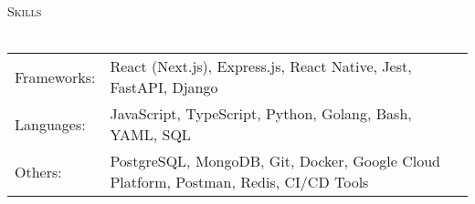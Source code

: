 \documentclass[a4paper]{article}
\newcommand{\lineunder} {
    \vspace*{-8pt} \\
    \hspace*{-12pt} \hrulefill \\
}
\newcommand{\header} [1] {
    {\hspace*{-12pt}\vspace*{6pt} \large\textsc{#1}}
    \vspace*{-6pt} \lineunder
}
\begin{document}
\header{Skills}
\vspace{1mm}
\begin{tabular}{ l l }
	Frameworks: & React (Next.js), Express.js, React Native, Jest, FastAPI, Django              \\
	Languages:  & JavaScript, TypeScript, Python, Golang, Bash, YAML, SQL                                \\
	Others:     & PostgreSQL, MongoDB, Git, Docker, Google Cloud Platform, Postman, Redis, CI/CD Tools   \\
\end{tabular}
\end{document}
